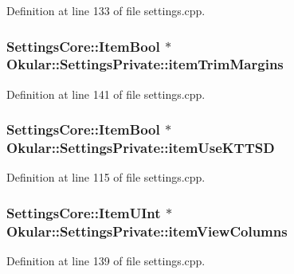 Definition at line 133 of file settings.\+cpp.

\hypertarget{classOkular_1_1SettingsPrivate_a980c4854d0545775b05ba317138a25d2}{
\subsubsection[{item\+Trim\+Margins}]{\setlength{\rightskip}{0pt plus 5cm}Settings\+Core\+::\+Item\+Bool $\ast$ Okular\+::\+Settings\+Private\+::item\+Trim\+Margins}}\label{classOkular_1_1SettingsPrivate_a980c4854d0545775b05ba317138a25d2}


Definition at line 141 of file settings.\+cpp.

\hypertarget{classOkular_1_1SettingsPrivate_a7d38a20ebf03326af44123c9fcb72688}{
\subsubsection[{item\+Use\+K\+T\+T\+S\+D}]{\setlength{\rightskip}{0pt plus 5cm}Settings\+Core\+::\+Item\+Bool $\ast$ Okular\+::\+Settings\+Private\+::item\+Use\+K\+T\+T\+S\+D}}\label{classOkular_1_1SettingsPrivate_a7d38a20ebf03326af44123c9fcb72688}


Definition at line 115 of file settings.\+cpp.

\hypertarget{classOkular_1_1SettingsPrivate_ad9434765834a0e3d0b1a20668baa905c}{
\subsubsection[{item\+View\+Columns}]{\setlength{\rightskip}{0pt plus 5cm}Settings\+Core\+::\+Item\+U\+Int $\ast$ Okular\+::\+Settings\+Private\+::item\+View\+Columns}}\label{classOkular_1_1SettingsPrivate_ad9434765834a0e3d0b1a20668baa905c}


Definition at line 139 of file settings.\+cpp.

